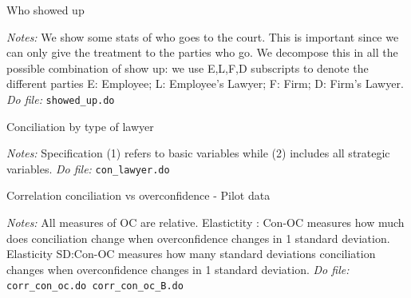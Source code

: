 \documentclass[11pt]{article}
\begin{document}
\begin{table}[H]
    \caption{Who showed up }
    \label{whoshowedup}
    \begin{center}
        \scriptsize{}
    \end{center}
    \footnotesize
    \textit{Notes:} 
We show some stats of who goes to the court. This is important since we can only give the treatment to the parties who go.  We decompose this in all the possible combination of show up: we use E,L,F,D subscripts to denote the different parties E: Employee; L: Employee’s Lawyer;  F: Firm; D: Firm’s Lawyer.
    \textit{Do file: } \texttt{showed\_up.do}
\end{table}







\begin{table}[H]
    \caption{Conciliation by type of lawyer}
    \label{tab:reg_con_oc}
    \begin{center}
        \scriptsize{}
    \end{center}
    \footnotesize
    \textit{Notes:} 
   Specification (1) refers to basic variables while (2) includes all strategic variables.
    \textit{Do file: } \texttt{con\_lawyer.do}
\end{table} 

\begin{landscape}




\end{landscape}


\begin{table}[H]
    \caption{Correlation conciliation vs overconfidence - Pilot data}
    \label{Table_concvsoc}
    \begin{center}
        \scriptsize{}
    \end{center}
    \footnotesize
    \textit{Notes:} 
    All measures of OC are relative. Elastictity : Con-OC measures how much does conciliation change when overconfidence changes in 1 standard deviation. Elasticity SD:Con-OC measures how many standard deviations conciliation changes when  overconfidence changes in 1 standard deviation.
    \textit{Do file: } \texttt{corr\_con\_oc.do corr\_con\_oc\_B.do}
\end{table}
\end{document}
